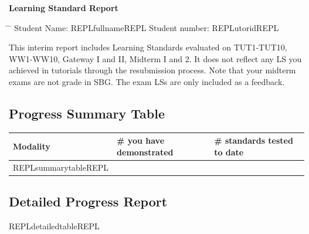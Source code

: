 
\setcounter{page}{1}
{\Large \centering \textbf{Learning Standard Report}}

\begin{tabbing}
    \hspace*{0em}\= \hspace*{12 cm} \= \kill
    \> Student Name: REPLfullnameREPL \>  Student number: REPLutoridREPL \\
\end{tabbing}

This interim report includes Learning Standards evaluated on TUT1-TUT10, WW1-WW10, Gateway I and II, Midterm I and 2. It does not reflect any LS you achieved in tutorials through the resubmission process. Note that your midterm exams are not grade in SBG. The exam LSs are only included as a feedback.

\subsection*{Progress Summary Table}
\begin{table}[!htbp]
    \centering
    \begin{tabularx}{\textwidth}{||X|l|l||}
        \toprule
        \textbf{Modality} & \textbf{\# you have demonstrated} & \textbf{\# standards tested to date} \\ \midrule \midrule
        REPLsummarytableREPL
        \bottomrule
    \end{tabularx}
\end{table}

\noindent
\subsection*{Detailed Progress Report}


REPLdetailedtableREPL

\newpage
